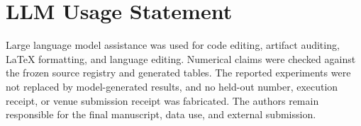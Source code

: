 \documentclass[10pt,twocolumn,letterpaper]{article}
\begin{document}
\section*{LLM Usage Statement}
Large language model assistance was used for code editing, artifact auditing,
LaTeX formatting, and language editing. Numerical claims were checked against the
frozen source registry and generated tables. The reported experiments were not
replaced by model-generated results, and no held-out number, execution receipt,
or venue submission receipt was fabricated. The authors remain responsible for
the final manuscript, data use, and external submission.

{\small


}
\end{document}
